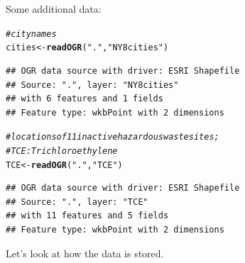 \documentclass{article}\usepackage[]{graphicx}\usepackage[]{color}
\makeatletter
\newcommand{\hlstr}[1]{\textcolor[rgb]{0.192,0.494,0.8}{#1}}%
\newcommand{\hlcom}[1]{\textcolor[rgb]{0.678,0.584,0.686}{\textit{#1}}}%
\newcommand{\hlstd}[1]{\textcolor[rgb]{0.345,0.345,0.345}{#1}}%
\newcommand{\hlkwb}[1]{\textcolor[rgb]{0.69,0.353,0.396}{#1}}%
\newcommand{\hlkwd}[1]{\textcolor[rgb]{0.737,0.353,0.396}{\textbf{#1}}}%
\newenvironment{kframe}{%
 \def\at@end@of@kframe{}%
 \ifinner\ifhmode%
  \def\at@end@of@kframe{\end{minipage}}%
  \begin{minipage}{\columnwidth}%
 \fi\fi%
 \def\FrameCommand##1{\hskip\@totalleftmargin \hskip-\fboxsep
 \colorbox{shadecolor}{##1}\hskip-\fboxsep
     \hskip-\linewidth \hskip-\@totalleftmargin \hskip\columnwidth}%
 \MakeFramed {\advance\hsize-\width
   \@totalleftmargin\z@ \linewidth\hsize
   \@setminipage}}%
 {\par\unskip\endMakeFramed%
 \at@end@of@kframe}
\newenvironment{knitrout}{}{} %
\makeatother
\begin{document}
Some additional data:

\begin{knitrout}
\color{fgcolor}\begin{kframe}
\begin{alltt}
\hlcom{#city names}
\hlstd{cities} \hlkwb{<-} \hlkwd{readOGR}\hlstd{(}\hlstr{"."}\hlstd{,} \hlstr{"NY8cities"}\hlstd{)}
\end{alltt}
\begin{verbatim}
## OGR data source with driver: ESRI Shapefile 
## Source: ".", layer: "NY8cities"
## with 6 features and 1 fields
## Feature type: wkbPoint with 2 dimensions
\end{verbatim}
\begin{alltt}
\hlcom{#locations of 11 inactive hazardous waste sites; }
\hlcom{# TCE: Trichloroethylene}
\hlstd{TCE} \hlkwb{<-} \hlkwd{readOGR}\hlstd{(}\hlstr{"."}\hlstd{,} \hlstr{"TCE"}\hlstd{)}
\end{alltt}
\begin{verbatim}
## OGR data source with driver: ESRI Shapefile 
## Source: ".", layer: "TCE"
## with 11 features and 5 fields
## Feature type: wkbPoint with 2 dimensions
\end{verbatim}
\end{kframe}
\end{knitrout}


Let's look at how the data is stored.
\end{document}
